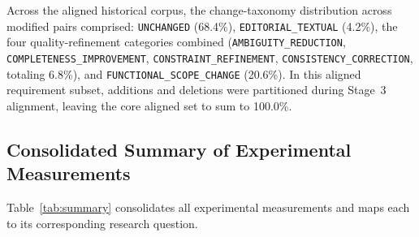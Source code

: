 \documentclass[journal]{IEEEtran}
\begin{document}
Across the aligned historical corpus, the change-taxonomy distribution across modified pairs comprised: \texttt{UNCHANGED} (68.4\%), \texttt{EDITORIAL\_TEXTUAL} (4.2\%), the four quality-refinement categories combined (\texttt{AMBIGUITY\_REDUCTION}, \texttt{COMPLETENESS\_IMPROVEMENT}, \texttt{CONSTRAINT\_REFINEMENT}, \texttt{CONSISTENCY\_CORRECTION}, totaling 6.8\%), and \texttt{FUNCTIONAL\_SCOPE\_CHANGE} (20.6\%). In this aligned requirement subset, additions and deletions were partitioned during Stage~3 alignment, leaving the core aligned set to sum to 100.0\%.

\subsection{Consolidated Summary of Experimental Measurements}
\label{sec:results-summary}

Table~\ref{tab:summary} consolidates all experimental measurements and maps each to its corresponding research question.
\end{document}
